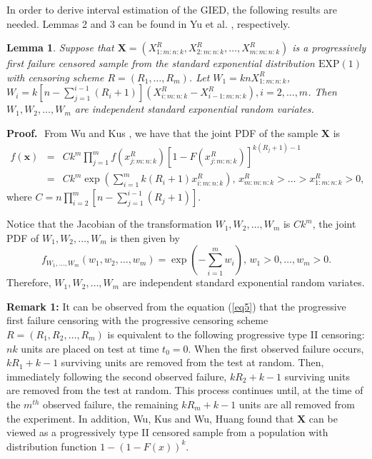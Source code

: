 \documentclass[12pt]{article}
\newtheorem {lemma}{Lemma}
\begin{document}

In order to derive interval estimation of the GIED, the following
results are needed. Lemmas 2 and 3 can be found in Yu et al. \cite{yu2013new}, respectively.

\begin{lemma}
Suppose that $\textbf{X}=(X_{1:m:n:k}^R,X_{2:m:n:k}^R, \dots,X_{m:m:n:k}^R)$ is a progressively first failure censored sample from the standard exponential distribution $\mbox{EXP}(1)$ with censoring scheme $R=(R_1,\ldots,R_m)$. Let $W_1=knX_{1:m:n:k}^R$, $W_i=k[n-\sum_{j=1}^{i-1}(R_i+1)](X_{i:m:n:k}^R-X_{i-1:m:n:k}^R), i=2,...,m$. Then $W_1, W_2, \dots, W_m$ are independent standard exponential random variates.
\end{lemma}
{\bf Proof.}\,\,
 From Wu and Kus \cite{wu2009estimation}, we have that the joint PDF of the sample $\textbf{X}$ is
\begin{eqnarray}
f(\textbf{x}%
)&=&Ck^m\prod_{j=1}^m f(x_{j:m:n:k}^R){[1-F(x_{j:m:n:k}^R)]^{k(R_j+1)-1}} \label{eq5}\\
&=&Ck^m \exp\left(\sum_{i=1}^m k(R_i+1)x_{i:m:n:k}^R\right), \,x_{m:m:n:k}^R>\dots>x_{1:m:n:k}^R>0,\nonumber
\end{eqnarray}
where $C=n\prod_{i=2}^m\left[n-\sum_{j=1}^{i-1}(R_j+1)\right]$.

Notice that the Jacobian of the transformation $W_1, W_2,\dots, W_m$ is $C k^m$, the joint PDF of $W_1, W_2,\dots, W_m$ is then given by
$$f_{W_1,\dots,W_m}(w_1,w_2,\dots,w_m)=\exp(-\sum_{i=1}^m w_i),\, w_1>0,\dots,w_m>0.$$
Therefore, $W_1, W_2, \dots, W_m$ are independent standard exponential random variates.

{\bf Remark 1:} It can be observed from the equation (\ref{eq5}) that the progressive first failure censoring with the progressive censoring scheme $R = (R_1,R_2,\dots, R_m)$ is equivalent to the following progressive type II censoring: $n k$ units are placed on test at time $t_0=0$. When the first observed failure occurs, $k R_1+k-1$ surviving units are removed from the test at random. Then, immediately following the second observed failure, $k R_2+k-1$ surviving units are removed from the test at random. This process continues until, at the time of the $m^{th}$ observed failure, the remaining $k R_m+k-1$ units are all removed from the experiment. In addition, Wu, Kus \cite{wu2009estimation} and Wu, Huang  \cite{wu2012progressively} found that $\textbf{X}$ can be viewed as a progressively type II censored sample from a population with distribution function $1-(1-F(x))^k$.
\end{document}
